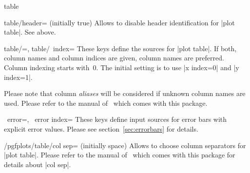 \begin{addplotoperation}[]{table}{}
\begin{itemize}
\end{itemize}
\end{addplotoperation}

\begin{pgfplotskey}{table/header= (initially true)}
	Allows to disable header identification for |plot table|. See above.
\end{pgfplotskey}
\begin{pgfplotsxykeylist}{table/\x=,
	table/\x\ index=}
	These keys define the sources for |plot table|. If both, column names and column indices are given, column names are preferred. Column indexing starts with~$0$. The initial setting is to use |x index=0| and |y index=1|. 

	Please note that column \emph{aliases} will be considered if unknown column names are used. Please refer to the manual of \PGFPlotstable\ which comes with this package.
\end{pgfplotsxykeylist}
\begin{pgfplotsxykeylist}{%
	\x\ error=,
	\x\ error index=}
	These keys define input sources for error bars with explicit error values. Please see section~\ref{sec:errorbars} for details.
\end{pgfplotsxykeylist}
\begin{key}{/pgfplots/table/col sep= (initially space)}
	Allows to choose column separators for |plot table|. Please refer to the manual of \PGFPlotstable\ which comes with this package for details about |col sep|.
\end{key}


